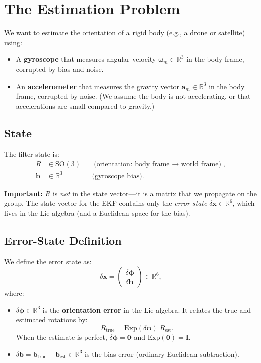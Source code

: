 \documentclass[11pt,letterpaper]{article}
\newcommand{\R}{\mathbb{R}}
\newcommand{\SO}{\mathrm{SO}(3)}
\newcommand{\expmap}{\mathrm{Exp}}
\newcommand{\eye}{\mathbf{I}}
\begin{document}
\newpage
\section{The Estimation Problem}

We want to estimate the orientation of a rigid body (e.g., a drone
or satellite) using:
\begin{itemize}[nosep]
  \item A \textbf{gyroscope} that measures angular velocity
    $\bm{\omega}_m \in \R^{3}$ in the body frame, corrupted by
    bias and noise.
  \item An \textbf{accelerometer} that measures the gravity vector
    $\mathbf{a}_m \in \R^{3}$ in the body frame, corrupted by
    noise.  (We assume the body is not accelerating, or that
    accelerations are small compared to gravity.)
\end{itemize}

\subsection{State}

The filter state is:
\begin{align*}
  R &\in \SO && \text{(orientation: body frame $\to$ world frame)}, \\
  \mathbf{b} &\in \R^{3} && \text{(gyroscope bias)}.
\end{align*}

\textbf{Important:}  $R$ is \emph{not} in the state vector---it is
a matrix that we propagate on the group.  The state vector for the
EKF contains only the \emph{error state}
$\delta\mathbf{x} \in \R^{6}$, which lives in the Lie algebra (and
a Euclidean space for the bias).

\subsection{Error-State Definition}

We define the error state as:
\[
  \boxed{
  \delta\mathbf{x}
  = \begin{pmatrix} \delta\bm{\phi} \\ \delta\mathbf{b} \end{pmatrix}
  \in \R^{6},
  }
\]
where:
\begin{itemize}[nosep]
  \item $\delta\bm{\phi} \in \R^{3}$ is the \textbf{orientation
    error} in the Lie algebra.  It relates the true and estimated
    rotations by:
    \[
      R_{\text{true}}
      = \expmap(\delta\bm{\phi})\; R_{\text{est}}.
    \]
    When the estimate is perfect, $\delta\bm{\phi} = \mathbf{0}$
    and $\expmap(\mathbf{0}) = \eye$.
  \item $\delta\mathbf{b} = \mathbf{b}_{\text{true}} -
    \mathbf{b}_{\text{est}} \in \R^{3}$ is the bias error
    (ordinary Euclidean subtraction).
\end{itemize}
\end{document}
